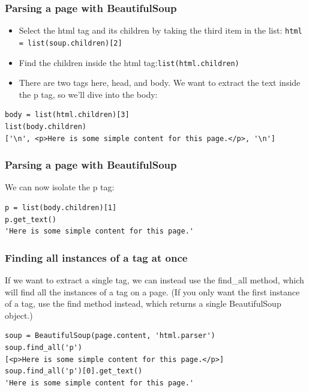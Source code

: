 \begin{frame}[fragile]\frametitle{Parsing a page with BeautifulSoup}
    \begin{itemize}
    \item Select the html tag and its children by taking the third item in the list: \lstinline|html = list(soup.children)[2]|
    \item Find the children inside the html tag:\lstinline|list(html.children)|
    \item There are two tags here, head, and body. We want to extract the text inside the p tag, so we'll dive into the body:
    \end{itemize}
        \begin{lstlisting}
body = list(html.children)[3]
list(body.children)
['\n', <p>Here is some simple content for this page.</p>, '\n']
\end{lstlisting}
\end{frame}

\begin{frame}[fragile]\frametitle{Parsing a page with BeautifulSoup}
We can now isolate the p tag:
        \begin{lstlisting}
p = list(body.children)[1]
p.get_text()
'Here is some simple content for this page.'
\end{lstlisting}
\end{frame}

\begin{frame}[fragile]\frametitle{Finding all instances of a tag at once}
 If we want to extract a single tag, we can instead use the find\_all method, which will find all
 the instances of a tag on a page. (If you only want the first instance of a tag, use the find
 method instead, which returns a single BeautifulSoup object.)
        \begin{lstlisting}
soup = BeautifulSoup(page.content, 'html.parser')
soup.find_all('p')
[<p>Here is some simple content for this page.</p>]
soup.find_all('p')[0].get_text()
'Here is some simple content for this page.'
\end{lstlisting}
\end{frame}

